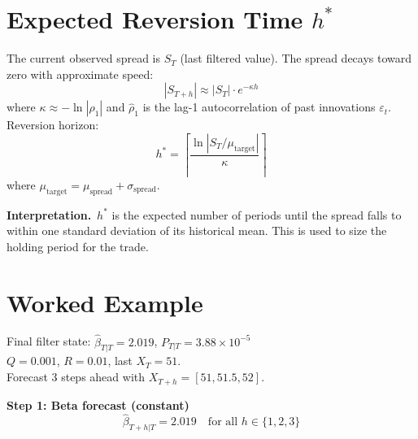 \documentclass[10pt,a4paper,twocolumn]{article}
\begin{document}
\section{Expected Reversion Time $h^*$}

\begin{tcolorbox}[mathbox={Formula 7 --- Reversion Time Estimate}]
\vspace{-4pt}
The current observed spread is $S_T$ (last filtered value).
The spread decays toward zero with approximate speed:
\begin{equation}
  |S_{T+h}| \approx |S_T|\cdot e^{-\kappa h}
\end{equation}
where $\kappa \approx -\ln|\hat\rho_1|$ and $\hat\rho_1$ is the
lag-1 autocorrelation of past innovations $\varepsilon_t$.\\[3pt]
Reversion horizon:
\begin{equation}
  h^* = \left\lceil \frac{\ln|S_T/\mu_{\text{target}}|}{\kappa} \right\rceil
\end{equation}
where $\mu_{\text{target}} = \mu_{\text{spread}} + \sigma_{\text{spread}}$.
\end{tcolorbox}

\noindent\textbf{Interpretation.}~$h^*$ is the expected number of periods
until the spread falls to within one standard deviation of its historical
mean.  This is used to size the holding period for the trade.

\section{Worked Example}

\begin{tcolorbox}[exbox={Setup}]
Final filter state: $\hat\beta_{T|T} = 2.019$,\; $P_{T|T} = 3.88\times10^{-5}$\\
$Q = 0.001$,\; $R = 0.01$,\; last $X_T = 51$.\\
Forecast 3 steps ahead with $X_{T+h} = [51, 51.5, 52]$.
\end{tcolorbox}

\noindent\textbf{Step 1: Beta forecast (constant)}
\[
  \hat\beta_{T+h|T} = 2.019 \quad\text{for all } h \in \{1,2,3\}
\]
\end{document}
